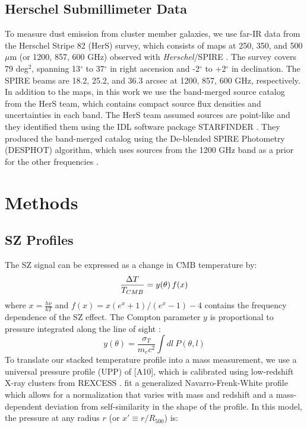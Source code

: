 \documentclass[a4paper,fleqn,usenatbib]{mnras}
\begin{document}
\subsection{Herschel Submillimeter Data}
To measure dust emission from cluster member galaxies, we use far-IR data from the Herschel Stripe 82 (HerS) survey, which consists of maps at 250, 350, and 500 $\mu$m (or 1200, 857, 600 GHz) observed with \textit{Herschel}/SPIRE \citep{2014ApJS..210...22V}. The survey covers 79 deg$^2$, spanning 13$^{\circ}$ to 37$^{\circ}$ in right ascension and -2$^{\circ}$ to +2$^{\circ}$ in declination. 
The SPIRE beams are 18.2, 25.2, and 36.3 arcsec at 1200, 857, 600 GHz, respectively. In addition to the maps, in this work we use the band-merged source catalog from the HerS team, which contains compact source flux densities and uncertainties in each band. The HerS team assumed sources are point-like and they identified them using the IDL software package STARFINDER \citep{2000A&AS..147..335D}. They produced the band-merged catalog using the De-blended SPIRE Photometry (DESPHOT) algorithm, which uses sources from the 1200 GHz band as a prior for the other frequencies \citep{2010MNRAS.409...48R}.


\section{Methods} \label{sec:methods}

\subsection{SZ Profiles}
The SZ signal can be expressed as a change in CMB temperature by: 
\begin{equation}
\centering
  \frac{\Delta T}{T_{CMB}} = y( \theta ) \, f( x )
\end{equation}
where $x = \frac{h \nu}{k T}$ and $f(x) = x ({e^{x} + 1})/{(e^{x}-1)} - 4$ contains the frequency dependence of the SZ effect. The Compton parameter $y$ is proportional to pressure integrated along the line of sight \citep{1972CoASP...4..173S,1970CoASP...2...66S}:
\begin{equation}
  y(\theta) = \frac{\sigma_{T}}{m_{e} c^{2}} \int dl\  P(\theta, l) \end{equation}
To translate our stacked temperature profile into a mass measurement, we use a universal pressure profile (UPP) of \cite{2010A&A...517A..92A} [A10], which is calibrated using low-redshift X-ray clusters from REXCESS \citep{2007A&A...469..363B}. \citeauthor{2010A&A...517A..92A} fit a generalized Navarro-Frenk-White profile which allows for a normalization that varies with mass and redshift and a mass-dependent deviation from self-similarity in the shape of the profile. In this model, the pressure at any radius $r$ (or $x' \equiv r/R_{500}$) is:
\end{document}
